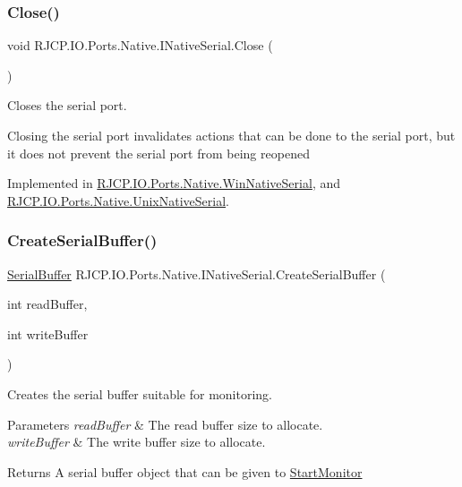 \subsubsection{\texorpdfstring{Close()}{Close()}}
{\footnotesize\ttfamily void R\+J\+C\+P.\+I\+O.\+Ports.\+Native.\+I\+Native\+Serial.\+Close (\begin{DoxyParamCaption}{ }\end{DoxyParamCaption})}



Closes the serial port. 

Closing the serial port invalidates actions that can be done to the serial port, but it does not prevent the serial port from being reopened 

Implemented in \mbox{\hyperlink{class_r_j_c_p_1_1_i_o_1_1_ports_1_1_native_1_1_win_native_serial_a4bd7bf6de34d7d8f70a4d245a00ffa77}{R\+J\+C\+P.\+I\+O.\+Ports.\+Native.\+Win\+Native\+Serial}}, and \mbox{\hyperlink{class_r_j_c_p_1_1_i_o_1_1_ports_1_1_native_1_1_unix_native_serial_aa1f5e5c1b74fbac54b63578c9a43ac86}{R\+J\+C\+P.\+I\+O.\+Ports.\+Native.\+Unix\+Native\+Serial}}.

\mbox{\label{interface_r_j_c_p_1_1_i_o_1_1_ports_1_1_native_1_1_i_native_serial_a15155443dbfd8aead3cc4ade53b1fa2b}} 
\subsubsection{\texorpdfstring{CreateSerialBuffer()}{CreateSerialBuffer()}}
{\footnotesize\ttfamily \mbox{\hyperlink{class_r_j_c_p_1_1_i_o_1_1_ports_1_1_native_1_1_serial_buffer}{Serial\+Buffer}} R\+J\+C\+P.\+I\+O.\+Ports.\+Native.\+I\+Native\+Serial.\+Create\+Serial\+Buffer (\begin{DoxyParamCaption}\item[{int}]{read\+Buffer,  }\item[{int}]{write\+Buffer }\end{DoxyParamCaption})}



Creates the serial buffer suitable for monitoring. 


\begin{DoxyParams}{Parameters}
{\em read\+Buffer} & The read buffer size to allocate.\\
\hline
{\em write\+Buffer} & The write buffer size to allocate.\\
\hline
\end{DoxyParams}
\begin{DoxyReturn}{Returns}
A serial buffer object that can be given to \mbox{\hyperlink{interface_r_j_c_p_1_1_i_o_1_1_ports_1_1_native_1_1_i_native_serial_a64481becda92f402e2eb7728ceb9de06}{Start\+Monitor}}
\end{DoxyReturn}


